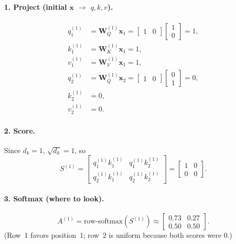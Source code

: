 \documentclass[11pt]{article}
\begin{document}
\paragraph{1. Project (initial \(\mathbf{x}\) \(\to\) \(q,k,v\)).}
\begin{align*}
  q_1^{(1)} &= \mathbf{W}_Q^{(1)}\mathbf{x}_1
             = \begin{bmatrix}1&0\end{bmatrix}\begin{bmatrix}1\\0\end{bmatrix}
             = 1, \\
  k_1^{(1)} &= \mathbf{W}_K^{(1)}\mathbf{x}_1 = 1, \\
  v_1^{(1)} &= \mathbf{W}_V^{(1)}\mathbf{x}_1 = 1, \\[0.4em]
  q_2^{(1)} &= \mathbf{W}_Q^{(1)}\mathbf{x}_2
             = \begin{bmatrix}1&0\end{bmatrix}\begin{bmatrix}0\\1\end{bmatrix}
             = 0, \\
  k_2^{(1)} &= 0, \\
  v_2^{(1)} &= 0.
\end{align*}

\paragraph{2. Score.}
Since \(d_k=1\), \(\sqrt{d_k}=1\), so
\[
  S^{(1)}
  =
  \begin{bmatrix}
    q_1^{(1)} k_1^{(1)} & q_1^{(1)} k_2^{(1)} \\[0.25em]
    q_2^{(1)} k_1^{(1)} & q_2^{(1)} k_2^{(1)}
  \end{bmatrix}
  =
  \begin{bmatrix}
    1 & 0 \\
    0 & 0
  \end{bmatrix}.
\]

\paragraph{3. Softmax (where to look).}
\[
  A^{(1)}
  =
  \mathrm{row\text{-}softmax}(S^{(1)})
  \approx
  \begin{bmatrix}
    0.73 & 0.27 \\
    0.50 & 0.50
  \end{bmatrix}.
\]
(Row~1 favors position~1; row~2 is uniform because both scores were 0.)
\end{document}
